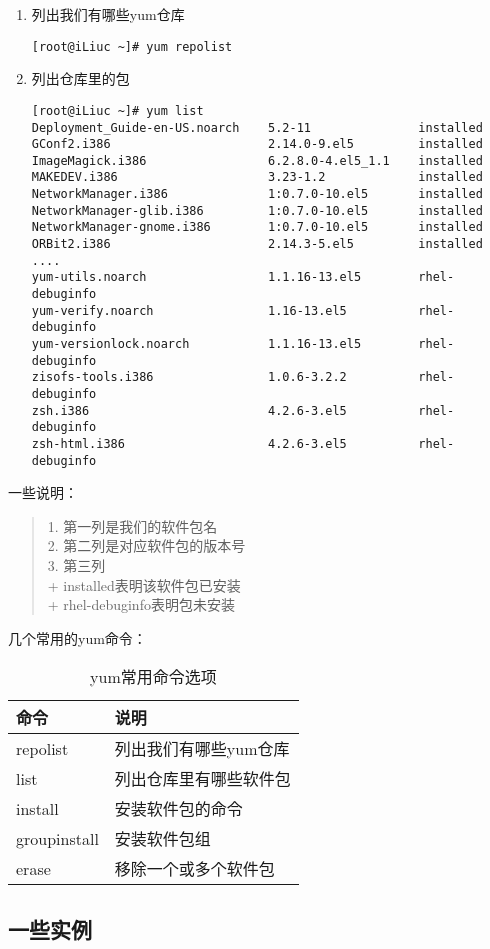 \begin{enumerate}[itemsep=0pt,parsep=0pt]
\item 列出我们有哪些yum仓库
  \small{
\begin{verbatim}
[root@iLiuc ~]# yum repolist
\end{verbatim}
  }
  \normalsize

\item 列出仓库里的包
\begin{verbatim}
[root@iLiuc ~]# yum list
Deployment_Guide-en-US.noarch    5.2-11               installed     
GConf2.i386                      2.14.0-9.el5         installed     
ImageMagick.i386                 6.2.8.0-4.el5_1.1    installed     
MAKEDEV.i386                     3.23-1.2             installed     
NetworkManager.i386              1:0.7.0-10.el5       installed     
NetworkManager-glib.i386         1:0.7.0-10.el5       installed     
NetworkManager-gnome.i386        1:0.7.0-10.el5       installed     
ORBit2.i386                      2.14.3-5.el5         installed    
....
yum-utils.noarch                 1.1.16-13.el5        rhel-debuginfo
yum-verify.noarch                1.16-13.el5          rhel-debuginfo
yum-versionlock.noarch           1.1.16-13.el5        rhel-debuginfo
zisofs-tools.i386                1.0.6-3.2.2          rhel-debuginfo
zsh.i386                         4.2.6-3.el5          rhel-debuginfo
zsh-html.i386                    4.2.6-3.el5          rhel-debuginfo
\end{verbatim}
\end{enumerate}

一些说明：
\begin{quote}
    1. 第一列是我们的软件包名 \\
    2. 第二列是对应软件包的版本号 \\
    3. 第三列 \\
    + installed表明该软件包已安装 \\
    + rhel-debuginfo表明包未安装 
\end{quote}

几个常用的yum命令：
\begin{table}[!htbp]
  \centering
    \caption{yum常用命令选项}
    \begin{tabular}{ll}
      \toprule
      命令           & 说明 \\
      \midrule
      repolist       & 列出我们有哪些yum仓库 \\
      list           & 列出仓库里有哪些软件包 \\
      install        & 安装软件包的命令 \\
      groupinstall   & 安装软件包组 \\
      erase          & 移除一个或多个软件包 \\
      \bottomrule
    \end{tabular}
\end{table}

\subsection{一些实例}
\label{sec:yumExamples}